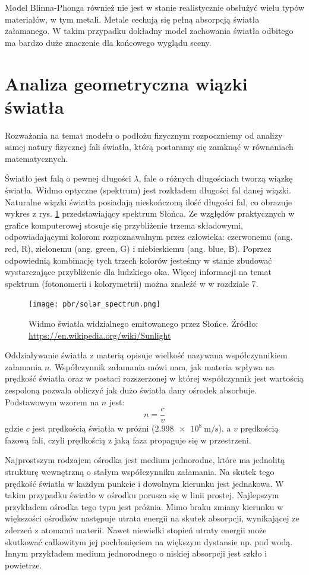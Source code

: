 \documentclass[../main.tex]{subfiles}
\begin{document}
Model Blinna-Phonga również nie jest w stanie realistycznie obsłużyć wielu
typów materiałów, w tym metali. Metale cechują się pełną absorpcją światła
załamanego. W takim przypadku dokładny model zachowania światła odbitego ma
bardzo duże znaczenie dla końcowego wyglądu sceny.

\section{Analiza geometryczna wiązki światła}

Rozważania na temat modelu o podłożu fizycznym rozpoczniemy od analizy samej natury fizycznej fali światła, którą postaramy się zamknąć w równaniach matematycznych. 

Światło jest falą o pewnej długości $\lambda$, fale o różnych długościach tworzą wiązkę światła. Widmo optyczne (spektrum) jest rozkładem długości fal danej
wiązki. Naturalne wiązki światła posiadają nieskończoną ilość długości fal, co obrazuje wykres z rys. \ref{fig:solar_spectrum} przedstawiający spektrum Słońca.  
Ze względów praktycznych w grafice komputerowej stosuje się przybliżenie trzema składowymi, odpowiadającymi kolorom rozpoznawalnym przez człowieka: czerwonemu (ang. red, R), zielonemu (ang. green, G) i niebieskiemu (ang. blue, B). Poprzez odpowiednią kombinację tych trzech kolorów jesteśmy w stanie zbudować wystarczające przybliżenie dla ludzkiego oka. Więcej informacji na temat spektrum (fotonomerii i kolorymetrii) można znaleźć w \cite{RealTimeRendering2008} w rozdziale 7.

\begin{figure}[ht]
  \centering
  \texttt{[image: pbr/solar\_spectrum.png]}
  \caption{Widmo światła widzialnego emitowanego przez Słońce. Źródło: \url{https://en.wikipedia.org/wiki/Sunlight}}
  \label{fig:solar_spectrum}
\end{figure}

Oddziaływanie światła z materią opisuje wielkość nazywana współczynnikiem załamania $n$. Współczynnik załamania mówi nam, jak materia wpływa na prędkość światła oraz w postaci rozszerzonej w której współczynnik jest wartością zespoloną pozwala obliczyć jak dużo światła dany ośrodek absorbuje. Podstawowym wzorem na $n$ jest:
\[
    n = \frac{c}{v}
\]
gdzie $c$ jest prędkością światła w próżni ($\SI{2.998e8}{\meter\per\second}$), a $v$ prędkością fazową fali, czyli prędkością z jaką faza propaguje się w przestrzeni.

Najprostszym rodzajem ośrodka jest medium jednorodne, które ma jednolitą strukturę wewnętrzną o stałym współczynniku załamania. Na skutek tego prędkość światła w każdym punkcie i dowolnym kierunku jest jednakowa. W takim przypadku światło w ośrodku porusza się w linii prostej. Najlepszym przykładem ośrodka tego typu jest próżnia. Mimo braku zmiany kierunku w większości ośrodków następuje utrata energii na skutek absorpcji, wynikającej ze zderzeń z atomami materii. Nawet niewielki stopień utraty energii może skutkować całkowitym jej pochłonięciem na większym dystansie np. pod wodą. Innym przykładem medium jednorodnego o niskiej absorpcji jest szkło i powietrze.
\end{document}
